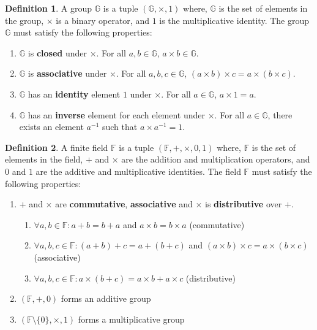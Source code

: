 \documentclass[twoside,11pt,openright]{report}
\theoremstyle{definition}
\newtheorem{definition}{Definition}[section]
\theoremstyle{plain}
\begin{document}
\begin{definition}
  \label{def:group}
  A group $\mathbb{G}$ is a tuple $(\mathbb{G}, \times, 1)$ where, $\mathbb{G}$ is the set of elements in the group, $\times$ is a binary operator, and $1$ is the multiplicative identity. The group $\mathbb{G}$ must satisfy the following properties:
  \begin{enumerate}
    \item $\mathbb{G}$ is \textbf{closed} under $\times$. For all $a,b \in \mathbb{G}$, $a \times b \in \mathbb{G}$.
    \item $\mathbb{G}$ is \textbf{associative} under $\times$. For all $a,b,c \in \mathbb{G}$, $(a \times b) \times c = a \times (b \times c)$.
    \item $\mathbb{G}$ has an \textbf{identity} element $1$ under $\times$. For all $a \in \mathbb{G}$, $a \times 1 = a$.
    \item $\mathbb{G}$ has an \textbf{inverse} element for each element under $\times$. For all $a \in \mathbb{G}$, there exists an element $a^{-1}$ such that $a \times a^{-1} = 1$.
  \end{enumerate}
\end{definition}

\begin{definition}
  \label{def:field}
  A finite field $\mathbb{F}$ is a tuple $(\mathbb{F}, +, \times, 0, 1)$ where, $\mathbb{F}$ is the set of elements in the field, $+$ and $\times$ are the addition and multiplication operators, and $0$ and $1$ are the additive and multiplicative identities. The field $\mathbb{F}$ must satisfy the following properties:
  \begin{enumerate}
    \item  $+$ and $\times$ are \textbf{commutative}, \textbf{associative} and $\times$ is \textbf{distributive} over $+$.
          \begin{enumerate}
            \item $\forall a,b \in \mathbb{F}: a + b = b + a$ and $a \times b = b \times a$ (commutative)
            \item $\forall a,b,c \in \mathbb{F}: (a + b) + c = a + (b + c)$ and $(a \times b) \times c = a \times (b \times c)$ (associative)
            \item $\forall a,b,c \in \mathbb{F}: a \times (b + c) = a \times b + a \times c$ (distributive)
          \end{enumerate}
    \item $(\mathbb{F}, +, 0)$ forms an additive group
    \item $(\mathbb{F} \setminus \{0\}, \times, 1)$ forms a multiplicative group
  \end{enumerate}
\end{definition}
\end{document}
